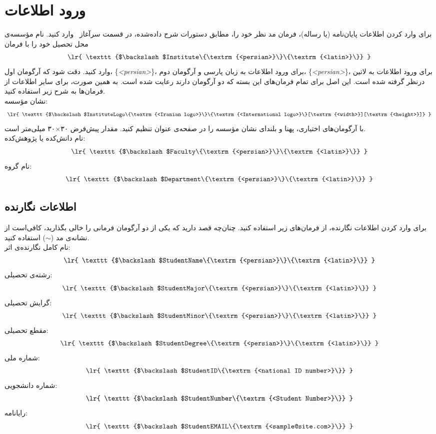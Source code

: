 \documentclass[12pt,a4paper,twoside,fleqn,notitlepage,openany]{extbook}
\begin{document}
\section{ورود اطلاعات}
برای وارد کردن اطلاعات پایان‌نامه (یا رساله)، فرمان مد نظر خود را، مطابق دستورات شرح داده‌شده، در قسمت سرآغاز ~وارد کنید.
نام مؤسسه‌ی محل تحصیل خود را با فرمان
\[ \textrm{ \lr{ \texttt{$\backslash$Institute\{\textrm{<persian>}\}\{\textrm{<latin>}\}} } } \]
وارد کنید. دقت شود که آرگومان اول، \{\emph{<persian>}\}، برای ورود اطلاعات به زبان پارسی و آرگومان دوم، \{\emph{<persian>}\}، برای ورود اطلاعات به لاتین درنظر گرفته شده است. این اصل برای تمام فرمان‌های این بسته که دو آرگومان دارند رعایت شده است\@. به همین صورت، برای سایر اطلاعات از فرمان‌ها به شرح زیر استفاده کنید\@. \\
نشان مؤسسه:
\[ \textrm{ \lr{ \texttt{$\backslash$InstituteLogo\{\textrm{<Iranian logo>}\}\{\textrm{<International logo>}\}[\textrm{<width>}][\textrm{<height>}]} } } \]
با آرگومان‌های اختیاری، پهنا و بلندای نشان مؤسسه را در صفحه‌ی عنوان تنظیم کنید. مقدار پیش‌فرض ۳۰×۳۰ میلی‌متر است\@. \\
نام دانش‌کده یا پژوهش‌کده:
\[ \textrm{ \lr{ \texttt{$\backslash$Faculty\{\textrm{<persian>}\}\{\textrm{<latin>}\}} } } \]
نام گروه:
\[ \textrm{ \lr{ \texttt{$\backslash$Department\{\textrm{<persian>}\}\{\textrm{<latin>}\}} } } \]
\subsection{اطلاعات نگارنده}
برای وارد کردن اطلاعات نگارنده، از فرمان‌های زیر استفاده کنید\@. چنان‌چه قصد دارید که یکی از دو آرگومان فرمانی را خالی بگذارید، کافی‌است از نشانه‌ی مد ($\sim$) استفاده کنید\@. \\
نام کامل نگارنده‌ی اثر:
\[ \textrm{ \lr{ \texttt{$\backslash$StudentName\{\textrm{<persian>}\}\{\textrm{<latin>}\}} } } \]
رشته‌ی تحصیلی:
\[ \textrm{ \lr{ \texttt{$\backslash$StudentMajor\{\textrm{<persian>}\}\{\textrm{<latin>}\}} } } \]
گرایش تحصیلی:
\[ \textrm{ \lr{ \texttt{$\backslash$StudentMinor\{\textrm{<persian>}\}\{\textrm{<latin>}\}} } } \]
مقطع تحصیلی:
\[ \textrm{ \lr{ \texttt{$\backslash$StudentDegree\{\textrm{<persian>}\}\{\textrm{<latin>}\}} } } \]
شماره ملی:
\[ \textrm{ \lr{ \texttt{$\backslash$StudentID\{\textrm{<national ID number>}\}} } } \]
شماره دانشجویی:
\[ \textrm{ \lr{ \texttt{$\backslash$StudentNumber\{\textrm{<Student Number>}\}} } } \]
رایانامه:
\[ \textrm{ \lr{ \texttt{$\backslash$StudentEMAIL\{\textrm{<sample@site.com>}\}} } } \]
\end{document}
